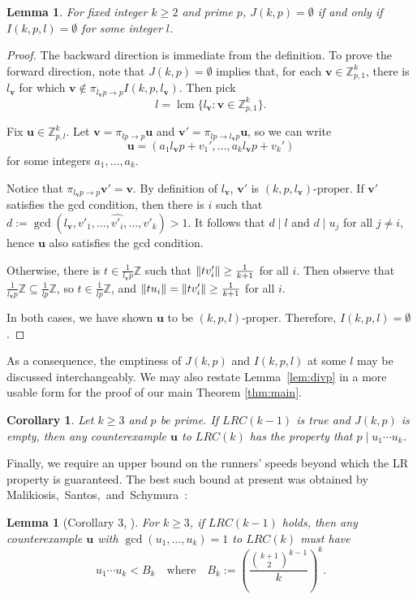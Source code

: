 \documentclass[11pt]{amsart}
\DeclarePairedDelimiter\norm{\lVert}{\rVert}
\newcommand{\Z}{\mathbb{Z}}
\newcommand{\vbf}{\mathbf{v}}
\newcommand{\ubf}{\mathbf{u}}
\newtheorem{lemma}[theorem]{Lemma}
\newtheorem{corollary}[theorem]{Corollary}
\theoremstyle{definition}
\theoremstyle{remark}
\begin{document}
\begin{lemma}
\label{lem:evenprop}
    For fixed integer $k \ge 2$ and prime $p$, $J(k,p)=\emptyset$ if and only if $I(k,p,l)=\emptyset$ for some integer $l$.
\end{lemma}
\begin{proof}
    The backward direction is immediate from the definition. 
    To prove the forward direction, note that $J(k,p)=\emptyset$ implies that,
    for each $\vbf\in \Z_{p,1}^k$, there is $l_\vbf$ for which $\vbf \notin \pi_{l_\vbf p \to p} I(k, p, l_\vbf)$. 
    Then pick \[l=\operatorname{lcm}\{l_\vbf:\vbf\in\Z_{p,1}^k\}.\] 
    
    Fix $\ubf\in\Z_{p,l}^k$. 
    Let $\vbf=\pi_{lp\rightarrow p}\ubf$ and $\vbf'=\pi_{lp\rightarrow l_\vbf p}\ubf$,
    so we can write \[\ubf=(a_1l_\vbf p+v_1',\ldots,a_kl_\vbf p+v_k')\] for some integers $a_1,\ldots,a_k$. 
    
    Notice that $\pi_{l_{\vbf}p \to p} \vbf' = \vbf$. 
    By definition of $l_\vbf$, $\vbf'$ is $(k,p,l_\vbf)$-proper. 
    If $\vbf'$ satisfies the gcd condition,
    then there is $i$ such that $d:=\gcd(l_\vbf, v'_1, \dots, \widehat{v'_{i}}, \dots, v'_k) > 1$. 
    It follows that $d\mid l$ and $d\mid u_j$ for all $j\neq i$, hence $\ubf$ also satisfies the gcd condition.

    Otherwise, there is $t\in\frac{1}{l_\vbf p}\Z$ such that $\norm{tv'_i}\geq\frac{1}{k+1}$ for all $i$. 
    Then observe that $\frac{1}{l_\vbf p}\Z\subseteq\frac{1}{lp}\Z$, so $t\in\frac{1}{lp}\Z$,
    and $\norm{tu_i}=\norm{tv'_i}\geq\frac{1}{k+1}$ for all $i$.

    In both cases, we have shown $\ubf$ to be $(k,p,l)$-proper.
    Therefore, $I(k,p,l)=\emptyset$.
\end{proof}

As a consequence, the emptiness of $J(k,p)$ and $I(k,p,l)$ at some $l$ may be discussed interchangeably.
We may also restate Lemma~\ref{lem:divp} in a more usable form for the proof of our main Theorem \ref{thm:main}.
\begin{corollary}\label{cor:evenpropdivp}
  Let $k \ge 3$ and $p$ be prime.
  If $LRC(k-1)$ is true and $J(k,p)$ is empty, then any counterexample $\ubf$ to $LRC(k)$ has the property that $p \mid u_1\cdots u_k$.
\end{corollary}

Finally, we require an upper bound on the runners' speeds beyond which the LR property is guaranteed.
The best such bound at present was obtained by Malikiosis,~Santos,~and~Schymura~\cite[Theorem 1.1]{Malikiosis}:
\begin{lemma}[Corollary 3, \cite{Rosenfeld}] \label{lem:proddivB}
    For $k \ge 3$, if $LRC(k-1)$ holds, then any counterexample $\ubf$ with $\gcd(u_1,\ldots,u_k)=1$ to $LRC(k)$ must have
    \[ u_1\cdots u_k < B_k \quad \text{where} \quad B_k := \left( \frac{\binom{k+1}{2}^{k-1}}{k} \right)^k. \]
\end{lemma}
\end{document}
